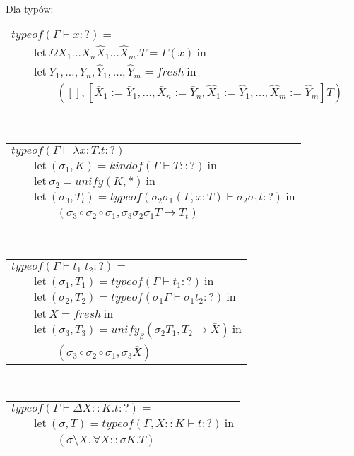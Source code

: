 \documentclass[11pt,leqno]{article}
\begin{document}
Dla typów:\\
\begin{tabular}{l}
$typeof(\Gamma \vdash x : ?) = $ \\
$\qquad \textrm{let} \ \Omega \bar{X}_1 \dots \bar{X}_n \widehat{X}_1 \dots \widehat{X}_m.T = \Gamma(x) \ \textrm{in} $ \\
$\qquad \textrm{let} \ \bar{Y}_1, \dots, \bar{Y}_n, \widehat{Y}_1, \dots, \widehat{Y}_m = fresh \ \textrm{in} $ \\
$\qquad\qquad ([], [\bar{X}_1 := \bar{Y}_1, \dots ,\bar{X}_n := \bar{Y}_n,\widehat{X}_1 := \widehat{Y}_1, \dots ,\widehat{X}_m := \widehat{Y}_m]T) $ \\
\end{tabular} \\
\begin{tabular}{l}
$typeof(\Gamma \vdash \lambda x:T.t : ?) = $ \\
$\qquad \textrm{let} \ (\sigma_1, K) = kindof(\Gamma \vdash T :: ?) \ \textrm{in} $ \\
$\qquad \textrm{let} \ \sigma_2 = unify(K, *) \ \textrm{in} $ \\
$\qquad \textrm{let} \ (\sigma_3, T_t) = typeof(\sigma_2 \sigma_1(\Gamma, x:T) \vdash \sigma_2 \sigma_1 t : ?) \ \textrm{in} $ \\
$\qquad\qquad (\sigma_3 \circ \sigma_2 \circ \sigma_1, \sigma_3 \sigma_2 \sigma_1 T \rightarrow T_t) $ \\
\end{tabular} \\
\begin{tabular}{l}
$typeof(\Gamma \vdash t_1 \; t_2 : ?) = $ \\
$\qquad \textrm{let} \ (\sigma_1, T_1) = typeof(\Gamma \vdash t_1 : ?) \ \textrm{in} $ \\
$\qquad \textrm{let} \ (\sigma_2, T_2) = typeof(\sigma_1 \Gamma \vdash \sigma_1 t_2 : ?) \ \textrm{in} $ \\
$\qquad \textrm{let} \ \bar{X} = fresh \ \textrm{in} $ \\
$\qquad \textrm{let} \ (\sigma_3, T_3) = unify_\beta(\sigma_2 T_1, T_2 \rightarrow \bar{X}) \ \textrm{in} $ \\
$\qquad\qquad (\sigma_3 \circ \sigma_2 \circ \sigma_1, \sigma_3 \bar{X}) $ \\
\end{tabular} \\
\begin{tabular}{l}
$typeof(\Gamma \vdash \Delta X::K.t : ?) = $ \\
$\qquad \textrm{let} \ (\sigma, T) = typeof(\Gamma, X::K \vdash t : ?) \ \textrm{in} $ \\
$\qquad\qquad (\sigma \setminus X, \forall X::\sigma K.T) $ \\
\end{tabular} \\
\end{document}
